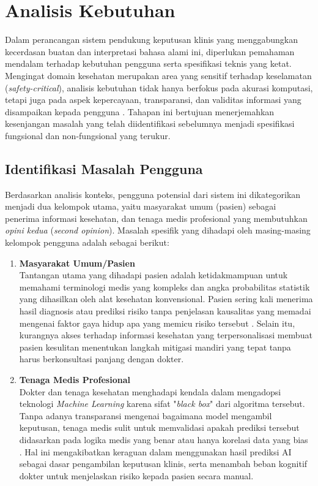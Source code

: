 \section{Analisis Kebutuhan}
Dalam perancangan sistem pendukung keputusan klinis yang menggabungkan kecerdasan buatan dan interpretasi bahasa alami ini, diperlukan pemahaman mendalam terhadap kebutuhan pengguna serta spesifikasi teknis yang ketat. Mengingat domain kesehatan merupakan area yang sensitif terhadap keselamatan (\textit{safety-critical}), analisis kebutuhan tidak hanya berfokus pada akurasi komputasi, tetapi juga pada aspek kepercayaan, transparansi, dan validitas informasi yang disampaikan kepada pengguna \parencite{Amann2020Explainability}. Tahapan ini bertujuan menerjemahkan kesenjangan masalah yang telah diidentifikasi sebelumnya menjadi spesifikasi fungsional dan non-fungsional yang terukur.

\subsection{Identifikasi Masalah Pengguna}
Berdasarkan analisis konteks, pengguna potensial dari sistem ini dikategorikan menjadi dua kelompok utama, yaitu masyarakat umum (pasien) sebagai penerima informasi kesehatan, dan tenaga medis profesional yang membutuhkan \textit{opini kedua} (\textit{second opinion}). Masalah spesifik yang dihadapi oleh masing-masing kelompok pengguna adalah sebagai berikut:

\begin{enumerate}
    \item \textbf{Masyarakat Umum/Pasien}\\
    Tantangan utama yang dihadapi pasien adalah ketidakmampuan untuk memahami terminologi medis yang kompleks dan angka probabilitas statistik yang dihasilkan oleh alat kesehatan konvensional. Pasien sering kali menerima hasil diagnosis atau prediksi risiko tanpa penjelasan kausalitas yang memadai mengenai faktor gaya hidup apa yang memicu risiko tersebut \parencite{Tjoa2021Survey}. Selain itu, kurangnya akses terhadap informasi kesehatan yang terpersonalisasi membuat pasien kesulitan menentukan langkah mitigasi mandiri yang tepat tanpa harus berkonsultasi panjang dengan dokter.
    
    \item \textbf{Tenaga Medis Profesional}\\
Dokter dan tenaga kesehatan menghadapi kendala dalam mengadopsi teknologi \textit{Machine Learning} karena sifat "\textit{black box}" dari algoritma tersebut. Tanpa adanya transparansi mengenai bagaimana model mengambil keputusan, tenaga medis sulit untuk memvalidasi apakah prediksi tersebut didasarkan pada logika medis yang benar atau hanya korelasi data yang bias \parencite{Linardatos2021Explainable}. Hal ini mengakibatkan keraguan dalam menggunakan hasil prediksi AI sebagai dasar pengambilan keputusan klinis, serta menambah beban kognitif dokter untuk menjelaskan risiko kepada pasien secara manual.
\end{enumerate}

